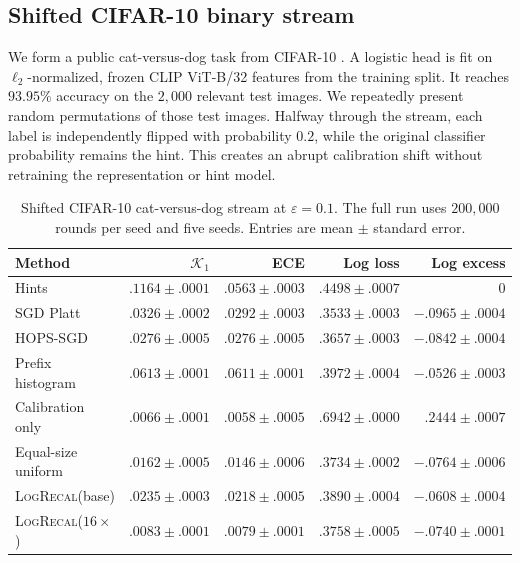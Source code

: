 \documentclass{article}
\newcommand{\method}{\textsc{LogRecal}\xspace}
\newcommand{\calK}{\mathcal{K}}
\begin{document}
\subsection{Shifted CIFAR-10 binary stream}

We form a public cat-versus-dog task from CIFAR-10 \citep{krizhevsky2009cifar}. A logistic head is fit on $\ell_2$-normalized, frozen CLIP ViT-B/32 features \citep{radford2021clip} from the training split. It reaches $93.95\%$ accuracy on the $2{,}000$ relevant test images. We repeatedly present random permutations of those test images. Halfway through the stream, each label is independently flipped with probability $0.2$, while the original classifier probability remains the hint. This creates an abrupt calibration shift without retraining the representation or hint model.

\begin{table}[t]
\centering
\caption{Shifted CIFAR-10 cat-versus-dog stream at $\varepsilon=0.1$.
The full run uses $200{,}000$ rounds per seed and five seeds. Entries are mean $\pm$ standard error.}
\label{tab:cifar}
\small
\begin{tabular}{lrrrr}
\toprule
Method & $\calK_1$ & ECE & Log loss & Log excess\\
\midrule
Hints & $.1164\mathbin{\pm}.0001$ & $.0563\mathbin{\pm}.0003$
& $.4498\mathbin{\pm}.0007$ & $0$\\
SGD Platt & $.0326\mathbin{\pm}.0002$ & $.0292\mathbin{\pm}.0003$
& $.3533\mathbin{\pm}.0003$ & $-.0965\mathbin{\pm}.0004$\\
HOPS-SGD & $.0276\mathbin{\pm}.0005$ & $.0276\mathbin{\pm}.0005$
& $.3657\mathbin{\pm}.0003$ & $-.0842\mathbin{\pm}.0004$\\
Prefix histogram & $.0613\mathbin{\pm}.0001$ & $.0611\mathbin{\pm}.0001$
& $.3972\mathbin{\pm}.0004$ & $-.0526\mathbin{\pm}.0003$\\
Calibration only & $\mathbf{.0066}\mathbin{\pm}.0001$
& $\mathbf{.0058}\mathbin{\pm}.0005$
& $.6942\mathbin{\pm}.0000$ & $.2444\mathbin{\pm}.0007$\\
Equal-size uniform & $.0162\mathbin{\pm}.0005$ & $.0146\mathbin{\pm}.0006$
& $.3734\mathbin{\pm}.0002$ & $-.0764\mathbin{\pm}.0006$\\
\method (base) & $.0235\mathbin{\pm}.0003$ & $.0218\mathbin{\pm}.0005$
& $.3890\mathbin{\pm}.0004$ & $-.0608\mathbin{\pm}.0004$\\
\method ($16\times$) & $.0083\mathbin{\pm}.0001$ & $.0079\mathbin{\pm}.0001$
& $.3758\mathbin{\pm}.0005$ & $-.0740\mathbin{\pm}.0001$\\
\bottomrule
\end{tabular}
\end{table}
\end{document}
